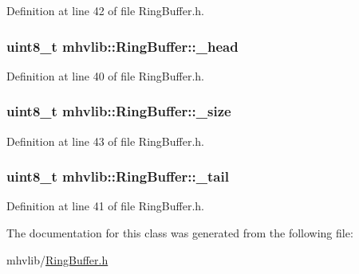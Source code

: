 Definition at line 42 of file Ring\-Buffer.\-h.

\hypertarget{classmhvlib_1_1_ring_buffer_a009a70f24456f622c38dd1563b5f09d7}{
\subsubsection[{\-\_\-head}]{\setlength{\rightskip}{0pt plus 5cm}uint8\-\_\-t mhvlib\-::\-Ring\-Buffer\-::\-\_\-head\hspace{0.3cm}{\ttfamily [protected]}}}\label{classmhvlib_1_1_ring_buffer_a009a70f24456f622c38dd1563b5f09d7}


Definition at line 40 of file Ring\-Buffer.\-h.

\hypertarget{classmhvlib_1_1_ring_buffer_a42fa3919c84d6556732b4c78aea71fe7}{
\subsubsection[{\-\_\-size}]{\setlength{\rightskip}{0pt plus 5cm}uint8\-\_\-t mhvlib\-::\-Ring\-Buffer\-::\-\_\-size\hspace{0.3cm}{\ttfamily [protected]}}}\label{classmhvlib_1_1_ring_buffer_a42fa3919c84d6556732b4c78aea71fe7}


Definition at line 43 of file Ring\-Buffer.\-h.

\hypertarget{classmhvlib_1_1_ring_buffer_abe5f23d5fe1f5c75a9fc88ee9cc4a33c}{
\subsubsection[{\-\_\-tail}]{\setlength{\rightskip}{0pt plus 5cm}uint8\-\_\-t mhvlib\-::\-Ring\-Buffer\-::\-\_\-tail\hspace{0.3cm}{\ttfamily [protected]}}}\label{classmhvlib_1_1_ring_buffer_abe5f23d5fe1f5c75a9fc88ee9cc4a33c}


Definition at line 41 of file Ring\-Buffer.\-h.



The documentation for this class was generated from the following file\-:\begin{DoxyCompactItemize}
\item 
mhvlib/\hyperlink{_ring_buffer_8h}{Ring\-Buffer.\-h}\end{DoxyCompactItemize}
